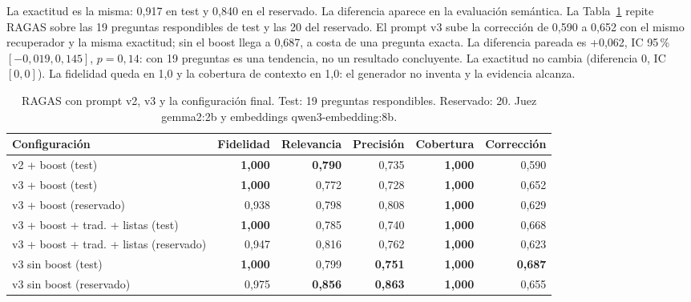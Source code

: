 La exactitud es la misma: 0,917 en test y 0,840 en el reservado. La diferencia aparece en la evaluaci\'on sem\'antica. La Tabla~\ref{tab:ragas-v3} repite RAGAS sobre las 19 preguntas respondibles de test y las 20 del reservado. El prompt v3 sube la correcci\'on de 0,590 a 0,652 con el mismo recuperador y la misma exactitud; sin el boost llega a 0,687, a costa de una pregunta exacta. La diferencia pareada es +0,062, IC 95\,\% $[-0{,}019, 0{,}145]$, $p=0{,}14$: con 19 preguntas es una tendencia, no un resultado concluyente. La exactitud no cambia (diferencia 0, IC $[0, 0]$). La fidelidad queda en 1,0 y la cobertura de contexto en 1,0: el generador no inventa y la evidencia alcanza.

\begin{table}[t]
\centering
\footnotesize
\caption{RAGAS con prompt v2, v3 y la configuraci\'on final. Test: 19 preguntas respondibles. Reservado: 20. Juez gemma2:2b y embeddings qwen3-embedding:8b.}
\label{tab:ragas-v3}
\begin{tabular}{lrrrrr}
\toprule
Configuraci\'on & Fidelidad & Relevancia & Precisi\'on & Cobertura & Correcci\'on \\
\midrule
v2 + boost (test) & \textbf{1,000} & \textbf{0,790} & 0,735 & \textbf{1,000} & 0,590 \\
v3 + boost (test) & \textbf{1,000} & 0,772 & 0,728 & \textbf{1,000} & 0,652 \\
v3 + boost (reservado) & 0,938 & 0,798 & 0,808 & \textbf{1,000} & 0,629 \\
v3 + boost + trad. + listas (test) & \textbf{1,000} & 0,785 & 0,740 & \textbf{1,000} & 0,668 \\
v3 + boost + trad. + listas (reservado) & 0,947 & 0,816 & 0,762 & \textbf{1,000} & 0,623 \\
v3 sin boost (test) & \textbf{1,000} & 0,799 & \textbf{0,751} & \textbf{1,000} & \textbf{0,687} \\
v3 sin boost (reservado) & 0,975 & \textbf{0,856} & \textbf{0,863} & \textbf{1,000} & 0,655 \\
\bottomrule
\end{tabular}
\end{table}

